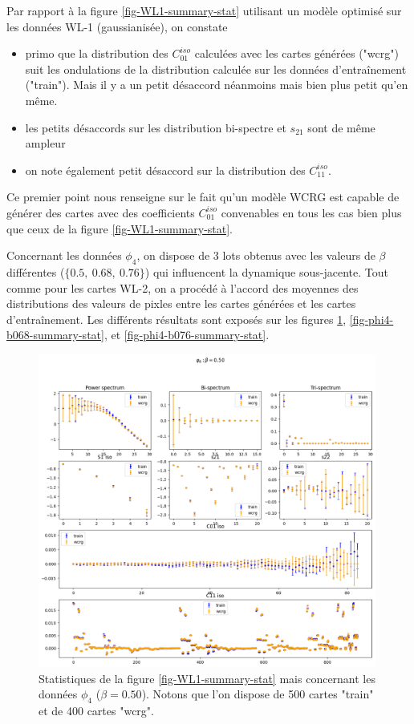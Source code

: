 \documentclass[12pt,twoside]{article}
\newcommand{\itemb}{\item[$\bullet$]}
\begin{document}
Par rapport à la figure \ref{fig-WL1-summary-stat} utilisant un modèle optimisé sur les données WL-1 (gaussianisée), on constate 
\begin{itemize}
\itemb primo que la distribution des $C_{01}^{iso}$  calculées avec les cartes générées ("wcrg") suit les ondulations de la distribution calculée sur les données d'entraînement ("train"). Mais il y a un petit désaccord néanmoins mais bien plus petit qu'en même.
\itemb les petits désaccords sur les distribution bi-spectre et $s_{21}$ sont de même ampleur
\itemb on note également petit désaccord  sur la distribution des $C_{11}^{iso}$.
\end{itemize}
Ce premier point nous renseigne sur le fait qu'un modèle WCRG est capable de générer des cartes avec des coefficients $C_{01}^{iso}$ convenables en tous les cas bien plus que ceux de la figure \ref{fig-WL1-summary-stat}. 

Concernant les données $\phi_4$, on dispose de 3 lots obtenus avec les valeurs de $\beta$ différentes ($\{0.5,\ 0.68,\ 0.76\}$) qui influencent la dynamique sous-jacente. Tout comme pour les cartes WL-2, on a procédé à l'accord des moyennes des distributions des valeurs de pixles entre les cartes générées et les  cartes d'entraînement. Les différents résultats sont exposés sur les figures \ref{fig-phi4-b050-summary-stat}, \ref{fig-phi4-b068-summary-stat}, et \ref{fig-phi4-b076-summary-stat}.

\begin{figure}
\centering
\includegraphics[width=0.99\textwidth]{fig-phi4-b050-summary-stat.png}
\caption{Statistiques de la figure \ref{fig-WL1-summary-stat} mais concernant les données $\phi_4$ ($\beta=0.50$).  Notons que l'on dispose de 500 cartes "train" et de 400 cartes "wcrg".}
\label{fig-phi4-b050-summary-stat}
\end{figure}
\end{document}
